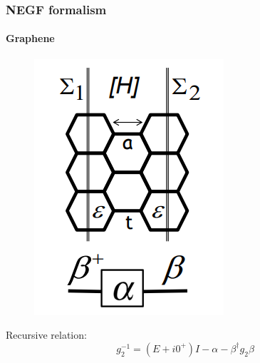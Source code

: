 \documentclass{beamer}
\begin{document}
{

    \begin{frame}
        \frametitle{NEGF formalism}
        \framesubtitle{Graphene}
        \scriptsize

\vspace{12pt}

\begin{figure}[!htbp]
\centering
\includegraphics[scale=0.2]{graphene.png}
\end{figure}

Recursive relation:
\begin{equation*}
    g^{-1}_{2} = (E+i0^{+})I-\alpha-\beta^{\dagger}g_{2}\beta
\end{equation*}

    \end{frame} 
}
\end{document}
